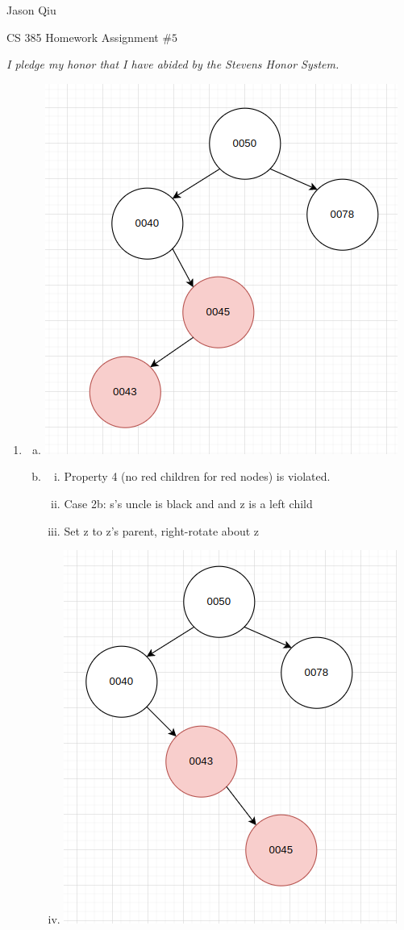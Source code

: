 \documentclass[a4paper,10pt]{article}
\begin{document}
Jason Qiu

CS 385 Homework Assignment $\#5$

\emph{I pledge my honor that I have abided by the Stevens Honor System.}
\begin{enumerate}
\item \begin{enumerate}[(a)]
	\item \centerline{\includegraphics[scale=0.5]{fig1}}
	\item \begin{enumerate}[i.]
		\item Property 4 (no red children for red nodes) is violated.
		\item Case 2b: s's uncle is black and and z is a left child
		\item Set z to z's parent, right-rotate about z
		\item \centerline{\includegraphics[scale=0.5]{fig2}}

\end{enumerate}
\end{enumerate}
\end{enumerate}
\end{document}

